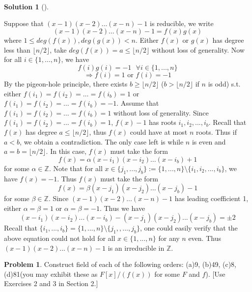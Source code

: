 \documentclass{article}
\newcommand{\sfa}{\text{  } \forall}
\newcommand{\floor}[1]{\lfloor #1 \rfloor}
\theoremstyle{definition}
\newtheorem{prob}{Problem}
\newtheorem*{sol}{Solution}
\newenvironment{sols}[1][]{%
  \begin{sol}[#1]$ $\par\nobreak\ignorespaces
}{%
  \end{sol}
}
\begin{document}
\begin{sols}
	Suppose that $(x - 1)(x - 2) \hdots (x - n) - 1$ is reducible, we write
	\[
		(x - 1)(x - 2) \hdots (x - n) - 1 = f(x) g(x)
	\]
	where $1 \leq deg(f(x)), deg(g(x)) < n$. 
	Either $f(x)$ or $g(x)$ has degree less than $\floor{n/2}$, take $deg(f(x)) = a \leq \floor{n/2}$ without loss of generality.
	Now for all $i \in \{1, ..., n\}$, we have
	\[
		f(i) g(i) = -1 \sfa i \in \{1, ..., n\}
	\]
	\[
		\Rightarrow f(i) = 1 \text{ or } f(i) = -1
	\]
	By the pigeon-hole principle, there exists $b \geq \floor{n/2}$ ($b > \floor{n/2}$ if $n$ is odd) s.t. either $f(i_1) = f(i_2) = \hdots = f(i_b) = 1$ or $f(i_1) = f(i_2) = \hdots = f(i_b) = -1$. 
	Assume that $f(i_1) = f(i_2) = \hdots = f(i_b) = 1$ without loss of generality.
	Since $f(i_1) = f(i_2) = \hdots = f(i_b) = 1$, $f(x) - 1$ has roots $i_1, i_2, ..., i_b$.
	Recall that $f(x)$ has degree $a \leq \floor{n/2}$, thus $f(x)$ could have at most $n$ roots.
	Thus if $a < b$, we obtain a contradiction. 
	The only case left is while $n$ is even and $a = b = \floor{n/2}$. 
	In this case, $f(x)$ must take the form
	\[
		f(x) = \alpha(x - i_1)(x - i_2) \hdots (x - i_b) + 1
	\]
	for some $\alpha \in \mathbb{Z}$.
	Note that for all $x \in \{j_1, ..., j_b\} := \{1, ..., n\} \setminus \{i_1, i_2, ..., i_b\} $, we have $f(x) = -1$.
	Thus $f(x)$ must take the form 
	\[
		f(x) = \beta(x - j_1)(x - j_2) \hdots (x - j_b) - 1
	\]
	for some $\beta \in \mathbb{Z}$.
	Since $(x - 1)(x - 2) ... (x - n) - 1$ has leading coefficient 1, either $\alpha = \beta = 1$ or $\alpha = \beta = -1$.
	Thus we have
	\[
		(x - i_1) (x - i_2) ... (x - i_b) - (x - j_1) (x - j_2) ... (x - j_b) = \pm 2
	\]
	Recall that $\{i_1, ..., i_b\} = \{1, ..., n\} \setminus \{j_1,, ..., j_b\}$, one could easily verify that the above equation could not hold for all $x \in \{1, ..., n\}$ for any $n$ even. 
	Thus $(x - 1)(x - 2) ... (x - n) - 1$ is an irreducible in $\mathbb{Z}$.
	
\end{sols}

\setcounter{prob}{5}
\begin{prob}
	Construct field of each of the following orders: (a)9,  (b)49,  (c)8,  (d)81(you may exhibit these as $F[x]/(f(x))$ for some $F$ and $f$). [Use Exercises 2 and 3 in Section 2.]
\end{prob}
\end{document}
